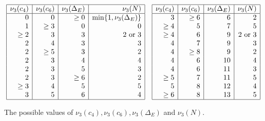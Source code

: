 \documentclass[11pt]{report}
\theoremstyle{definition}
\begin{document}
\begin{table}[h]
$$
\begin{array}{|r|r|r|r|}
\hline
\nu_3 (c_4) & \nu_3 (c_6) & \nu_3 (\Delta_E) & \nu_3 (N)  \\ \hline
0 & 0 & \geq 0  & \min \{ 1, \nu_3 (\Delta_E)  \}  \\
1 & \geq 3 & 0 & 0  \\
\geq 2 & 3 & 3 & 2 \mbox{ or } 3  \\
2 & 4 & 3 & 3  \\
2 & \geq 5 & 3 & 2  \\
2 & 3 & 4 & 4  \\
2 & 3 & 5 & 3  \\
2 & 3 & \geq 6 & 2  \\
\geq 3 & 4 & 5 & 5  \\
3 & 5 & 6 & 4  \\
\hline
\end{array}
\quad
\begin{array}{|r|r|r|r|}
\hline
\nu_3 (c_4) & \nu_3 (c_6) & \nu_3 (\Delta_E) & \nu_3 (N)  \\ \hline
 3 & \geq 6 & 6 & 2 \\
 \geq 4 & 5 & 7 & 5 \\
 \geq 4 & 6 & 9 & 2 \mbox{ or } 3 \\
 4 & 7 & 9 & 3 \\
 4 & \geq 8 & 9 & 2 \\
 4 & 6 & 10 & 4 \\
 4 & 6 & 11 & 3 \\
 \geq 5 & 7 & 11 & 5 \\
 5 & 8 & 12 & 4 \\
 \geq 6 & 8 & 13 & 5 \\
\hline
\end{array}
$$

\caption{The possible values of $\nu_3(c_4), \nu_3(c_6), \nu_3(\Delta_E)$ and $\nu_3(N)$.}
\label{tab nu3}
\end{table}
\end{document}
